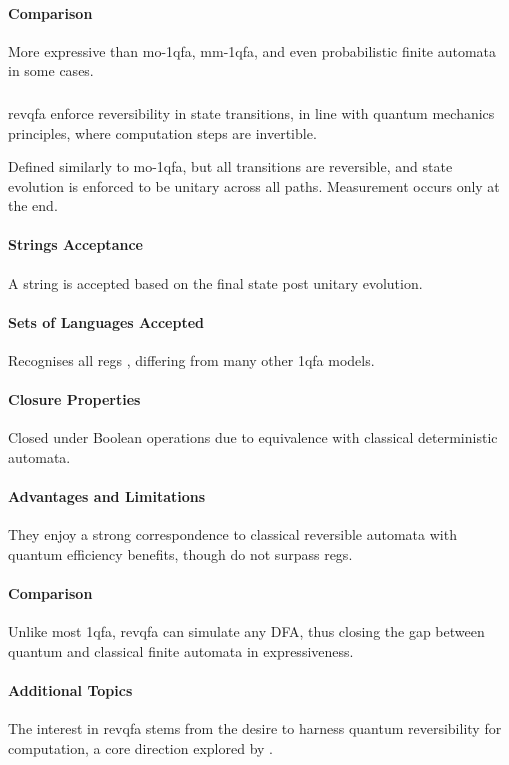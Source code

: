 \paragraph{Comparison}
More expressive than \gls{mo-1qfa}, \gls{mm-1qfa}, and even probabilistic finite automata in some cases.

\subsubsection{}
\gls{revqfa} enforce reversibility in state transitions, in line with quantum mechanics principles, where computation steps are invertible.

\begin{definition}
Defined similarly to \gls{mo-1qfa}, but all transitions are reversible, and state evolution is enforced to be unitary across all paths. Measurement occurs only at the end.
\end{definition}

\paragraph{Strings Acceptance}
A string is accepted based on the final state post unitary evolution.

\paragraph{Sets of Languages Accepted}
Recognises all \glspl{reg} \cite{yamakami2014one}, differing from many other \gls{1qfa} models.

\paragraph{Closure Properties}
Closed under Boolean operations due to equivalence with classical deterministic automata.

\paragraph{Advantages and Limitations}
They enjoy a strong correspondence to classical reversible automata with quantum efficiency benefits, though do not surpass \glspl{reg}.

\paragraph{Comparison}
Unlike most \gls{1qfa}, \gls{revqfa} can simulate any DFA, thus closing the gap between quantum and classical finite automata in expressiveness.

\paragraph{Additional Topics}
The interest in \gls{revqfa} stems from the desire to harness quantum reversibility for computation, a core direction explored by \cite{ciamarra2001quantum}.
